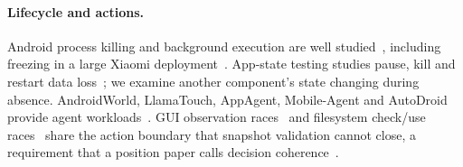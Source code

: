 \paragraph{Lifecycle and actions.} Android process killing and background execution are well studied~\cite{lebeck2020marvin,liang2020acclaim,chen2015background,pathak2012nosleep}, including freezing in a large Xiaomi deployment~\cite{zheng2024mproc}. App-state testing studies pause, kill and restart data loss~\cite{shan2016krefinder,riganelli2020dataloss,adamsen2015adverse}; we examine another component's state changing during absence. AndroidWorld, LlamaTouch, AppAgent, Mobile-Agent and AutoDroid provide agent workloads~\cite{rawles2025androidworld,zhang2024llamatouch,zhang2025appagent,wang2024mobileagent,wen2024autodroid}. GUI observation races~\cite{qian2026rebinding,jiang2026atomicity} and filesystem check/use races~\cite{bishop1996races} share the action boundary that snapshot validation cannot close, a requirement that a position paper calls decision coherence~\cite{jiang2026contextlake}.
